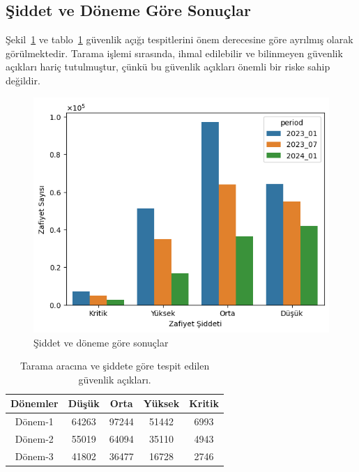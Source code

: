 \subsection{Şiddet ve Döneme Göre Sonuçlar}\label{subsec:results-severity-and-period}

Şekil~\ref{fig:vuln-severity-period-1} ve tablo~\ref{tab:vuln-severity-period-1} güvenlik açığı tespitlerini önem derecesine göre ayrılmış olarak görülmektedir. Tarama işlemi sırasında, ihmal edilebilir ve bilinmeyen güvenlik açıkları hariç tutulmuştur, çünkü bu güvenlik açıkları önemli bir riske sahip değildir.

\begin{figure}[!htbp]
    \centering
    \includegraphics[width=1\linewidth]{images/s2/vuln-severity-period-1.png}
    \caption{Şiddet ve döneme göre sonuçlar}\label{fig:vuln-severity-period-1}
\end{figure}

\begin{table}[!htbp]
    \caption{Tarama aracına ve şiddete göre tespit edilen güvenlik açıkları.}\label{tab:vuln-severity-period-1}
    \centering
    \begin{tabular}{ |c|c|c|c|c| }
        \hline
        Dönemler & Düşük & Orta & Yüksek & Kritik \\
        \hline
        Dönem-1 & 64263 & 97244 & 51442 & 6993 \\
        Dönem-2 & 55019 & 64094 & 35110 & 4943 \\
        Dönem-3 & 41802 & 36477 & 16728 & 2746 \\
        \hline
    \end{tabular}
\end{table}

